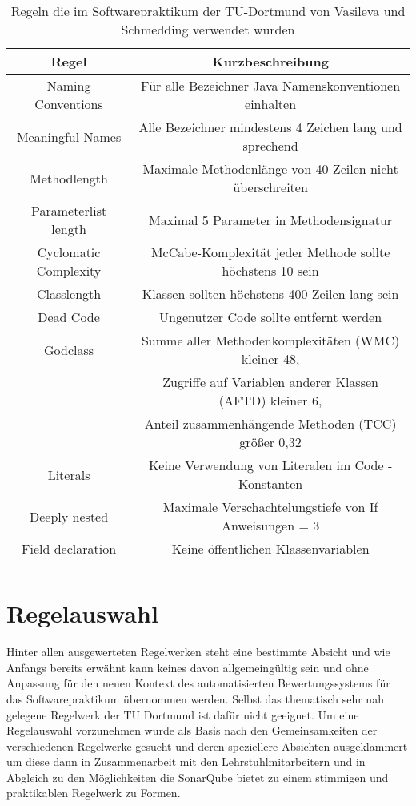 \documentclass[da,ngerman]{stthesis}
\begin{document}
				\begin{center}
					\tabulinesep=1.5mm
					\begin{longtabu}{|c|c|}
						\hline
  						\textbf{Regel} & \textbf{Kurzbeschreibung}\\
  						\hline
  						Naming Conventions & Für alle Bezeichner Java Namenskonventionen einhalten \\
  						\hline
						Meaningful Names & Alle Bezeichner mindestens 4 Zeichen lang und sprechend \\
						\hline
						Methodlength & Maximale Methodenlänge von 40 Zeilen nicht überschreiten \\
						\hline
						Parameterlist length & Maximal 5 Parameter in Methodensignatur \\
						\hline
						Cyclomatic Complexity & McCabe-Komplexität jeder Methode sollte höchstens 10 sein \\
						\hline
						Classlength & Klassen sollten höchstens 400 Zeilen lang sein \\
						\hline
						Dead Code & Ungenutzer Code sollte entfernt werden \\
						\hline
						Godclass  & Summe aller Methodenkomplexitäten (WMC) kleiner 48, \\ & Zugriffe auf Variablen anderer Klassen (AFTD) kleiner 6, \\ & Anteil zusammenhängende Methoden (TCC) größer 0,32 \\
						\hline
						Literals & Keine Verwendung von Literalen im Code - Konstanten \\
						\hline
						Deeply nested & Maximale Verschachtelungstiefe von If Anweisungen = 3 \\
						\hline
						Field declaration & Keine öffentlichen Klassenvariablen \\
  						\hline
  						\caption{Regeln die im Softwarepraktikum der TU-Dortmund von Vasileva und Schmedding verwendet wurden \cite{ImproveCodeQuality}}
						\label{soprarules}
  					\end{longtabu}   
  				\end{center}
		\section{Regelauswahl}
			Hinter allen ausgewerteten Regelwerken steht eine bestimmte Absicht und wie Anfangs bereits erwähnt kann keines davon allgemeingültig sein und ohne Anpassung für den neuen Kontext des automatisierten Bewertungssystems für das Softwarepraktikum übernommen werden. Selbst das thematisch sehr nah gelegene Regelwerk der TU Dortmund ist dafür nicht geeignet. Um eine Regelauswahl vorzunehmen wurde als Basis nach den Gemeinsamkeiten der verschiedenen Regelwerke gesucht und deren speziellere Absichten ausgeklammert um diese dann in Zusammenarbeit mit den Lehrstuhlmitarbeitern und in Abgleich zu den Möglichkeiten die SonarQube bietet zu einem stimmigen und praktikablen Regelwerk zu Formen.
\end{document}
